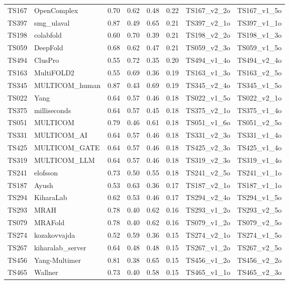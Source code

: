 \begin{longtable}{llllllll}
TS167 & OpenComplex & 0.70 & 0.62 & 0.48 & 0.22 & TS167\_v2\_2o & TS167\_v1\_5o \\ 
TS397 & smg\_ulaval & 0.87 & 0.49 & 0.65 & 0.21 & TS397\_v2\_1o & TS397\_v1\_1o \\ 
TS198 & colabfold & 0.60 & 0.70 & 0.39 & 0.21 & TS198\_v2\_2o & TS198\_v1\_3o \\ 
TS059 & DeepFold & 0.68 & 0.62 & 0.47 & 0.21 & TS059\_v2\_3o & TS059\_v1\_5o \\ 
TS494 & ClusPro & 0.55 & 0.72 & 0.35 & 0.20 & TS494\_v1\_4o & TS494\_v2\_4o \\ 
TS163 & MultiFOLD2 & 0.55 & 0.69 & 0.36 & 0.19 & TS163\_v1\_3o & TS163\_v2\_5o \\ 
TS345 & MULTICOM\_human & 0.87 & 0.43 & 0.69 & 0.19 & TS345\_v2\_4o & TS345\_v1\_5o \\ 
TS022 & Yang & 0.64 & 0.57 & 0.46 & 0.18 & TS022\_v1\_5o & TS022\_v2\_1o \\ 
TS375 & milliseconds & 0.64 & 0.57 & 0.45 & 0.18 & TS375\_v2\_1o & TS375\_v1\_4o \\ 
TS051 & MULTICOM & 0.79 & 0.46 & 0.61 & 0.18 & TS051\_v1\_6o & TS051\_v2\_5o \\ 
TS331 & MULTICOM\_AI & 0.64 & 0.57 & 0.46 & 0.18 & TS331\_v2\_3o & TS331\_v1\_4o \\ 
TS425 & MULTICOM\_GATE & 0.64 & 0.57 & 0.46 & 0.18 & TS425\_v2\_3o & TS425\_v1\_4o \\ 
TS319 & MULTICOM\_LLM & 0.64 & 0.57 & 0.46 & 0.18 & TS319\_v2\_3o & TS319\_v1\_4o \\ 
TS241 & elofsson & 0.73 & 0.50 & 0.55 & 0.18 & TS241\_v2\_5o & TS241\_v1\_1o \\ 
TS187 & Ayush & 0.53 & 0.63 & 0.36 & 0.17 & TS187\_v2\_1o & TS187\_v1\_1o \\ 
TS294 & KiharaLab & 0.62 & 0.53 & 0.46 & 0.17 & TS294\_v2\_4o & TS294\_v1\_5o \\ 
TS293 & MRAH & 0.78 & 0.40 & 0.62 & 0.16 & TS293\_v1\_2o & TS293\_v2\_5o \\ 
TS079 & MRAFold & 0.78 & 0.40 & 0.62 & 0.16 & TS079\_v1\_2o & TS079\_v2\_5o \\ 
TS274 & kozakovvajda & 0.52 & 0.59 & 0.36 & 0.15 & TS274\_v2\_1o & TS274\_v1\_5o \\ 
TS267 & kiharalab\_server & 0.64 & 0.48 & 0.48 & 0.15 & TS267\_v1\_2o & TS267\_v2\_5o \\ 
TS456 & Yang-Multimer & 0.81 & 0.38 & 0.65 & 0.15 & TS456\_v1\_2o & TS456\_v2\_2o \\ 
TS465 & Wallner & 0.73 & 0.40 & 0.58 & 0.15 & TS465\_v1\_1o & TS465\_v2\_3o \\ 

\end{longtable}
